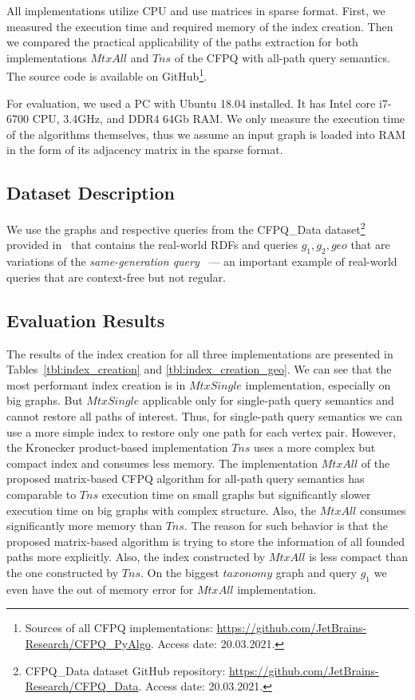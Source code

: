 All implementations utilize CPU and use matrices in sparse format. First, we measured the execution time and required memory of the index creation. Then we compared the practical applicability of the paths extraction for both implementations $MtxAll$ and $Tns$ of the CFPQ with all-path query semantics. The source code is available on GitHub\footnote{Sources of all CFPQ implementations: \url{https://github.com/JetBrains-Research/CFPQ\_PyAlgo}. Access date: 20.03.2021.}.

For evaluation, we used a PC with Ubuntu 18.04 installed.
It has Intel core i7-6700 CPU, 3.4GHz, and DDR4 64Gb RAM.
We only measure the execution time of the algorithms themselves, thus we assume an input graph is loaded into RAM in the form of its adjacency matrix in the sparse format.

\subsection{Dataset Description}

We use the graphs and respective queries from the CFPQ\_Data dataset\footnote{CFPQ\_Data dataset GitHub repository: \url{https://github.com/JetBrains-Research/CFPQ_Data}. Access date: 20.03.2021.} provided in~\cite{10.1145/3398682.3399163} that contains the real-world RDFs and queries $g_1, g_2, geo$ 
that are variations of the \textit{same-generation query}~\cite{FndDB} --- an important example of real-world queries that are context-free but not regular.




\subsection{Evaluation Results}
The results of the index creation for all three implementations are presented in Tables~\ref{tbl:index_creation} and \ref{tbl:index_creation_geo}. We can see that the most performant index creation is in $MtxSingle$ implementation, especially on big graphs. But $MtxSingle$ applicable only for single-path query semantics  and cannot restore all paths of interest. Thus, for single-path query semantics we can use a more simple index to restore only one path for each vertex pair. However, the Kronecker product-based implementation $Tns$ uses a more complex but compact index and consumes less memory. The implementation $MtxAll$ of the proposed matrix-based CFPQ algorithm for all-path query semantics has comparable to $Tns$ execution time on small graphs but significantly slower execution time on big graphs with complex structure. Also, the $MtxAll$ 
consumes significantly more memory than $Tns$. The reason for such behavior is that the proposed matrix-based algorithm is trying to store the information of all founded paths more explicitly. Also, the index constructed by $MtxAll$ is less compact than the one constructed by $Tns$. On the biggest $taxonomy$ graph and query $g_1$ we even have the out of memory error for $MtxAll$ implementation.

